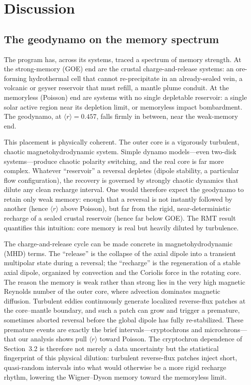 \documentclass[12pt,a4paper]{article}
\begin{document}
\section{Discussion}

\subsection{The geodynamo on the memory spectrum}

The program has, across its systems, traced a spectrum of memory strength. At the strong-memory (GOE) end are the crustal charge-and-release systems: an ore-forming hydrothermal cell that cannot re-precipitate in an already-sealed vein, a volcanic or geyser reservoir that must refill, a mantle plume conduit. At the memoryless (Poisson) end are systems with no single depletable reservoir: a single solar active region near its depletion limit, or memoryless impact bombardment. The geodynamo, at $\langle r\rangle=0.457$, falls firmly in between, near the weak-memory end.

This placement is physically coherent. The outer core is a vigorously turbulent, chaotic magnetohydrodynamic system. Simple dynamo models---even two-disk systems---produce chaotic polarity switching, and the real core is far more complex. Whatever ``reservoir'' a reversal depletes (dipole stability, a particular flow configuration), the recovery is governed by strongly chaotic dynamics that dilute any clean recharge interval. One would therefore expect the geodynamo to retain only weak memory: enough that a reversal is not instantly followed by another (hence $\langle r\rangle$ above Poisson), but far from the rigid, near-deterministic recharge of a sealed crustal reservoir (hence far below GOE). The RMT result quantifies this intuition: core memory is real but heavily diluted by turbulence.

The charge-and-release cycle can be made concrete in magnetohydrodynamic (MHD) terms. The ``release'' is the collapse of the axial dipole into a transient multipolar state during a reversal; the ``recharge'' is the regeneration of a stable axial dipole, organized by convection and the Coriolis force in the rotating core. The reason the memory is weak rather than strong lies in the very high magnetic Reynolds number of the outer core, where advection dominates magnetic diffusion. Turbulent eddies continuously generate localized reverse-flux patches at the core--mantle boundary, and such a patch can grow and trigger a premature, sometimes aborted reversal before the global dipole has fully re-stabilized. These premature events are exactly the brief intervals---cryptochrons and microchrons---that our analysis shows pull $\langle r\rangle$ toward Poisson. The cryptochron dependence of Section~3.2 is therefore not merely a data uncertainty but the statistical fingerprint of this physical dilution: turbulent reverse-flux patches inject short, quasi-random intervals into what would otherwise be a more rigid recharge rhythm, lowering the Wigner--Dyson memory toward the memoryless limit.
\end{document}
